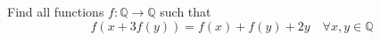 Find all functions $f:\mathbb{Q}\to \mathbb{Q}$ such that
\[ f(x+3f(y))=f(x)+f(y)+2y \quad \forall x,y\in \mathbb{Q}\]